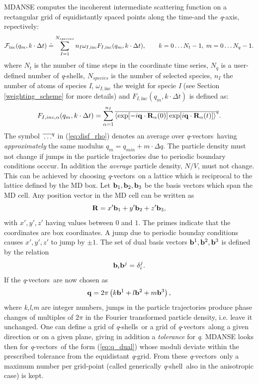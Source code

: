 \documentclass[a4paper,11pt]{article}
\newcommand{\qval}{\textit{q}}
\newcommand{\qvects}{\textit{q}-vectors}
\newcommand{\qshell}{\textit{q}-shell}
\newcommand{\qshells}{\textit{q}-shells}
\begin{document}
\gls{MDANSE} computes the incoherent intermediate scattering function on a rectangular grid of equidistantly spaced points
along the time-and the \qval-axis, repectively:
\begin{equation}
{\cal F}_{\mathrm{inc}}(q_m,k\cdot\Delta t) \doteq \sum\limits_{I = 1}^{N_{species}} n_I \omega_{I,\mathrm{inc}} F_{I,\mathrm{inc}}(q_m,k\cdot\Delta t),
\qquad k = 0\ldots N_t - 1,\; m = 0\ldots N_q - 1.
\end{equation}
where $N_t$ is the number of time steps in the coordinate time series, $N_q$ is a user-defined number of \qshells,
$N_{species}$ is the number of selected species, $n_I$ the number of atoms of species \textit{I}, $\omega_{I,\mathrm{inc}}$
the weight for specie \textit{I} (see Section \ref{weighting_scheme} for more details) and $F_{I,\mathrm{inc}}(q_m,k\cdot\Delta t)$ is defined as:
\begin{equation}
\label{eq:disf_rho}
F_{I, inc,\alpha}(q_m,k\cdot\Delta t) = \sum\limits_{\alpha=1}^{n_I}\overline{\langle\exp[-i{\bf q}\cdot{\bf R}_\alpha(0)]\exp[i{\bf q}\cdot{\bf R}_\alpha(t)]\rangle}^q.
\end{equation}
The symbol $\overline{\rule{0pt}{5pt}\ldots}^{q}$ in (\ref{eq:disf_rho}) denotes an average over \qvects\ having
{\em approximately} the same modulus $q_m = q_{min} + m\cdot\Delta q$. The particle density must not change if jumps in
the particle trajectories due to periodic boundary conditions occcur. In addition the {\em average} particle density,
$N/V$, must not change. This can be achieved by choosing \qvects\ on a lattice which is reciprocal to the lattice defined
by the \gls{MD} box. Let ${\bf b}_1,{\bf b}_2,{\bf b}_3$ be the basis vectors which span the \gls{MD} cell. Any position vector in the
\gls{MD} cell can be written as
\begin{equation}
{\bf R} = x'{\bf b}_1 + y'{\bf b}_2 + z'{\bf b}_3,
\end{equation}
with $x',y',z'$ having values between $0$ and $1$.  The primes indicate that the coordinates are box coordinates. A jump due
to periodic bounday conditions causes $x',y',z'$ to jump by $\pm 1$.  The set of dual basis vectors ${\bf b}^1,{\bf b}^2,{\bf b}^3$
is defined by the relation
\begin{equation}
{\bf b}_i{\bf b}^j = \delta_i^j.
\end{equation}
If the \qvects\ are now chosen as
\begin{equation}
\label{eq:q_dual}
{\bf q} = 2\pi\left(k{\bf b}^1 + l{\bf b}^2 + m{\bf b}^3\right),
\end{equation}
where \textit{k,l,m} are integer numbers, jumps in the particle trajectories produce phase changes of multiples of $2\pi$ in the
Fourier transformed particle density, i.e. leave it unchanged. One can define a grid of \qshells\ or a grid of \qvects\
along a given direction or on a given plane, giving in addition a {\em tolerance} for \qval. \gls{MDANSE} looks then for
\qvects\ of the form (\ref{eq:q_dual}) whose moduli deviate within the prescribed tolerance from the equidistant \qval-grid.
From these \qvects\ only a maximum number per grid-point (called generically \qshell\ also in the anisotropic case) is
kept.
\end{document}
